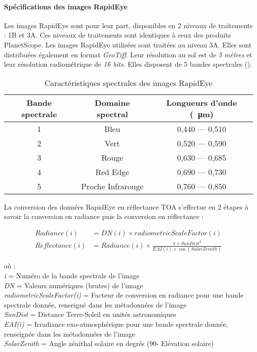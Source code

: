   \paragraph{Spécifications des images RapidEye}

Les images RapidEye sont pour leur part, disponibles en 2 niveaux de traitements : 1B et 3A. Ces niveaux de traitements sont identiques à ceux des produits PlanetScope. Les images
RapidEye utilisées sont traitées au niveau 3A. Elles sont distribuées également en format \emph{GeoTiff}. Leur résolution au sol est de \emph{5 mètres} et leur résolution 
radiométrique de \emph{16 bits}. Elles disposent de 5 bandes spectrales ().

\begin{table}[htbp]
\begin{center}
\caption{Caractéristiques spectrales des images RapidEye}
\label{rapideye}
 \begin{tabular}{ccc}
  \hline
  Bande spectrale & Domaine spectral & Longueurs d'onde (\SI{}{\micro\meter})\\
  \hline
  1 & Bleu & 0,440 --- 0,510 \\
  2 & Vert & 0,520 --- 0,590 \\
  3 & Rouge & 0,630 --- 0,685 \\
  4 & Red Edge & 0,690 --- 0,730 \\ 
  5 & Proche Infrarouge & 0,760 --- 0,850 \\
  \hline
 \end{tabular}
\end{center}
\end{table}

La conversion des données RapidEye en réflectance TOA s'effectue en 2 étapes à savoir la conversion en radiance puis la conversion en réflectance :

\begin{align} Radiance (i) &=   DN(i) \times radiometricScaleFactor(i) \\
Reflectance(i) &=   Radiance(i) \times \frac{\pi \times SunDist^2}{EAI(i) \times \cos(SolarZenith)} 
\end{align}

où :\\
\emph{i} = Numéro de la bande spectrale de l'image \\
\emph{DN} = Valeurs numériques (brutes) de l'image \\
\emph{radiometricScaleFactor(i)} = Facteur de conversion en radiance pour une bande spectrale donnée, renseigné dans les métadonnées de l'image \\
\emph{SunDist} = Distance Terre-Soleil en unités astronomiques \\
\emph{EAI(i)} = Irradiance exo-atmosphérique pour une bande spectrale donnée, renseignée dans les métadonnées de l'image \\
\emph{SolarZenith} = Angle zénithal solaire en degrés (90\textdegree - Elévation solaire)

